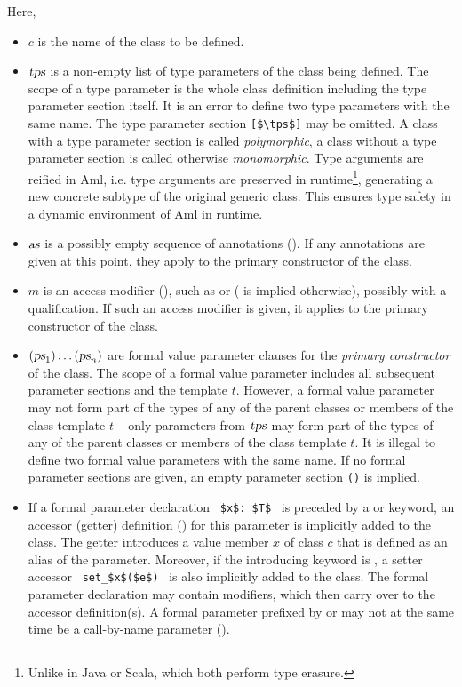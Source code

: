 Here, 
\begin{itemize}
\item[]
$c$ is the name of the class to be defined. 

\item[]
$\mbox{\sl tps}$ is a non-empty list of type parameters of the class being defined. The scope of a type parameter is the whole class definition including the type parameter section itself. It is an error to define two type parameters with the same name. The type parameter section \lstinline![$\tps$]! may be omitted. A class with a type parameter section is called {\em polymorphic}, a class without a type parameter section is called otherwise {\em monomorphic}. Type arguments are reified in Aml, i.e. type arguments are preserved in runtime\footnote{Unlike in Java or Scala, which both perform type erasure.}, generating a new concrete subtype of the original generic class. This ensures type safety in a dynamic environment of Aml in runtime. 

\item[]
$\mbox{\sl as}$ is a possibly empty sequence of annotations (). If any annotations are given at this point, they apply to the primary constructor of the class. 

\item[]
$m$ is an access modifier (), such as  or  ( is implied otherwise), possibly with a qualification. If such an access modifier is given, it applies to the primary constructor of the class. 

\item[]
$(\mbox{\sl ps}_1)\ldots(\mbox{\sl ps}_n)$ are formal value parameter clauses for the {\em primary constructor} of the class. The scope of a formal value parameter includes all subsequent parameter sections and the template $t$. However, a formal value parameter may not form part of the types of any of the parent classes or members of the class template $t$ -- only parameters from $\mbox{\sl tps}$ may form part of the types of any of the parent classes or members of the class template $t$. It is illegal to define two formal value parameters with the same name. If no formal parameter sections are given, an empty parameter section \lstinline!()! is implied. 

\item[]
If a formal parameter declaration ~\lstinline!$x$: $T$!~ is preceded by a  or  keyword, an accessor (getter) definition () for this parameter is implicitly added to the class. The getter introduces a value member $x$ of class $c$ that is defined as an alias of the parameter. Moreover, if the introducing keyword is , a setter accessor ~\lstinline!set_$x$($e$)!~ is also implicitly added to the class. The formal parameter declaration may contain modifiers, which then carry over to the accessor definition(s). A formal parameter prefixed by  or  may not at the same time be a call-by-name parameter (). 


\end{itemize}
